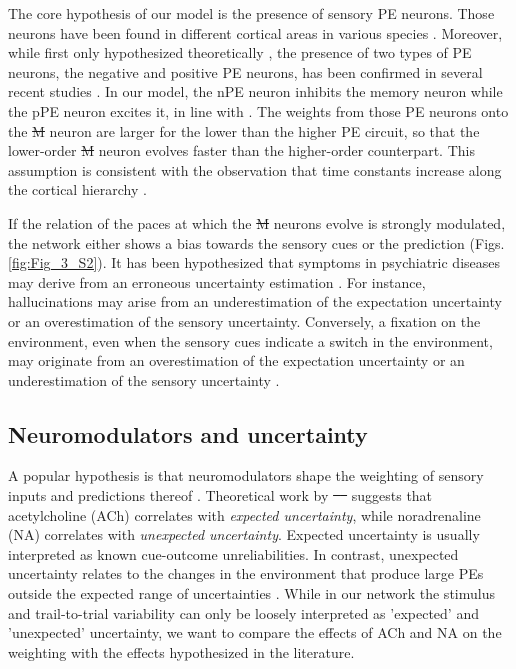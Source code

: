 \documentclass[10pt,a4paper]{article}
\providecommand{\DIFaddtex}[1]{{\protect\color{blue}\uwave{#1}}} %
\providecommand{\DIFdeltex}[1]{{\protect\color{red}\sout{#1}}}                      %
\providecommand{\DIFaddbegin}{} %
\providecommand{\DIFaddend}{} %
\providecommand{\DIFdelbegin}{} %
\providecommand{\DIFdelend}{} %
\providecommand{\DIFadd}[1]{\texorpdfstring{\DIFaddtex{#1}}{#1}} %
\providecommand{\DIFdel}[1]{\texorpdfstring{\DIFdeltex{#1}}{}} %
\newcommand{\DIFscaledelfig}{0.5}
\newlength{\DIFdelgraphicswidth} %
\newlength{\DIFdelgraphicsheight} %
\newcommand{\DIFaddincludegraphics}[2][]{{\color{blue}\fbox{\DIFOincludegraphics[#1]{#2}}}} %
\newcommand{\DIFdelincludegraphics}[2][]{%
\sbox{\DIFdelgraphicsbox}{\DIFOincludegraphics[#1]{#2}}%
\settoboxwidth{\DIFdelgraphicswidth}{\DIFdelgraphicsbox} %
\settoboxtotalheight{\DIFdelgraphicsheight}{\DIFdelgraphicsbox} %
\scalebox{\DIFscaledelfig}{%
\parbox[b]{\DIFdelgraphicswidth}{\usebox{\DIFdelgraphicsbox}\\[-\baselineskip] \rule{\DIFdelgraphicswidth}{0em}}\llap{\resizebox{\DIFdelgraphicswidth}{\DIFdelgraphicsheight}{%
\setlength{\unitlength}{\DIFdelgraphicswidth}%
\begin{picture}(1,1)%
\thicklines\linethickness{2pt} %
{\color[rgb]{1,0,0}\put(0,0){\framebox(1,1){}}}%
{\color[rgb]{1,0,0}\put(0,0){\line( 1,1){1}}}%
{\color[rgb]{1,0,0}\put(0,1){\line(1,-1){1}}}%
\end{picture}%
}\hspace*{3pt}}} %
} %
\DeclareRobustCommand{\DIFaddbegin}{\DIFOaddbegin \let\includegraphics\DIFaddincludegraphics} %
\DeclareRobustCommand{\DIFaddend}{\DIFOaddend \let\includegraphics\DIFOincludegraphics} %
\DeclareRobustCommand{\DIFdelbegin}{\DIFOdelbegin \let\includegraphics\DIFdelincludegraphics} %
\DeclareRobustCommand{\DIFdelend}{\DIFOaddend \let\includegraphics\DIFOincludegraphics} %
\begin{document}
The core hypothesis of our model is the presence of sensory PE neurons. Those neurons have been found in different cortical areas in various species \citep{eliades2008neural, keller2009neural, ayaz2019layer, audette2021temporally}. Moreover, while first only hypothesized theoretically \citep{rao1999predictive}, the presence of two types of PE neurons, the negative and positive PE neurons, has been confirmed in several recent studies \citep{keller2012sensorimotor, attinger2017visuomotor, jordan2020opposing, audette2021temporally}. In our model, the nPE neuron inhibits the memory neuron while the pPE neuron excites it, in line with \cite{keller2018predictive}. The weights from those PE neurons onto the \DIFdelbegin \DIFdel{M }\DIFdelend \DIFaddbegin \DIFadd{memory }\DIFaddend neuron are larger for the lower than the higher PE circuit, so that the lower-order \DIFdelbegin \DIFdel{M }\DIFdelend \DIFaddbegin \DIFadd{memory }\DIFaddend neuron evolves faster than the higher-order counterpart. This assumption is consistent with the observation that time constants increase along the cortical hierarchy \citep{murray2014hierarchy, chaudhuri2015large, runyan2017distinct}.

If the relation of the paces at which the \DIFdelbegin \DIFdel{M }\DIFdelend \DIFaddbegin \DIFadd{memory }\DIFaddend neurons evolve is strongly modulated, the network either shows a bias towards the sensory cues or the prediction (Figs. \ref{fig:Fig_3_S2}). It has been hypothesized that symptoms in psychiatric diseases may derive from an erroneous uncertainty estimation \citep{yon2021precision}. For instance, hallucinations may arise from an underestimation of the expectation uncertainty or an overestimation of the sensory uncertainty. Conversely, a fixation on the environment, even when the sensory cues indicate a switch in the environment, may originate from an overestimation of the expectation uncertainty or an underestimation of the sensory uncertainty \citep{yon2021precision}.


\subsection*{Neuromodulators and uncertainty}
%
A popular hypothesis is that neuromodulators shape the weighting of sensory inputs and predictions thereof \citep{yon2021precision}. Theoretical work by \DIFdelbegin \DIFdel{\mbox{%
\citep{yu2005uncertainty} }\hskip0pt%
}\DIFdelend \DIFaddbegin \DIFadd{\mbox{%
\cite{yu2005uncertainty} }\hskip0pt%
}\DIFaddend suggests that acetylcholine (ACh) correlates with \textit{expected uncertainty}, while noradrenaline (NA) correlates with \textit{unexpected uncertainty}. Expected uncertainty is usually interpreted as known cue-outcome unreliabilities. In contrast, unexpected uncertainty relates to the changes in the environment that produce large PEs outside the expected range of uncertainties \citep{yu2005uncertainty}. While in our network the stimulus and trail-to-trial variability can only be loosely interpreted as 'expected' and 'unexpected' uncertainty, we want to compare the effects of ACh and NA on the weighting with the effects hypothesized in the literature.
\end{document}
